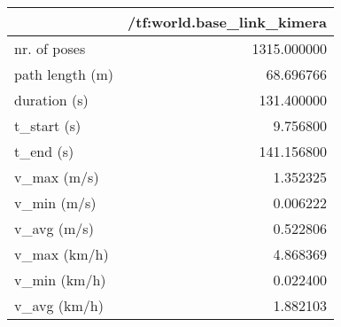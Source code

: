 \begin{tabular}{lr}
\toprule
{} &  /tf:world.base\_link\_kimera \\
\midrule
nr. of poses    &                 1315.000000 \\
path length (m) &                   68.696766 \\
duration (s)    &                  131.400000 \\
t\_start (s)     &                    9.756800 \\
t\_end (s)       &                  141.156800 \\
v\_max (m/s)     &                    1.352325 \\
v\_min (m/s)     &                    0.006222 \\
v\_avg (m/s)     &                    0.522806 \\
v\_max (km/h)    &                    4.868369 \\
v\_min (km/h)    &                    0.022400 \\
v\_avg (km/h)    &                    1.882103 \\
\bottomrule
\end{tabular}
